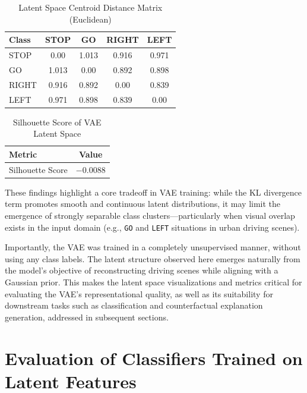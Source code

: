 \begin{table}[h]
\centering
\caption{Latent Space Centroid Distance Matrix (Euclidean)}
\begin{tabular}{lcccc}
\toprule
\textbf{Class} & \textbf{STOP} & \textbf{GO} & \textbf{RIGHT} & \textbf{LEFT} \\
\midrule
STOP   & 0.00 & 1.013 & 0.916 & 0.971 \\
GO     & 1.013 & 0.00 & 0.892 & 0.898 \\
RIGHT  & 0.916 & 0.892 & 0.00 & 0.839 \\
LEFT   & 0.971 & 0.898 & 0.839 & 0.00 \\
\bottomrule
\end{tabular}
\label{tab:centroid_distance_matrix}
\end{table}

\begin{table}[h]
\centering
\caption{Silhouette Score of VAE Latent Space}
\begin{tabular}{lc}
\toprule
\textbf{Metric} & \textbf{Value} \\
\midrule
Silhouette Score & $-0.0088$ \\
\bottomrule
\end{tabular}
\label{tab:silhouette_score}
\end{table}

These findings highlight a core tradeoff in VAE training: while the KL divergence term promotes smooth and continuous latent distributions, it may limit the emergence of strongly separable class clusters—particularly when visual overlap exists in the input domain (e.g., \texttt{GO} and \texttt{LEFT} situations in urban driving scenes).

Importantly, the VAE was trained in a completely unsupervised manner, without using any class labels. The latent structure observed here emerges naturally from the model's objective of reconstructing driving scenes while aligning with a Gaussian prior. This makes the latent space visualizations and metrics critical for evaluating the VAE’s representational quality, as well as its suitability for downstream tasks such as classification and counterfactual explanation generation, addressed in subsequent sections.












\section{Evaluation of Classifiers Trained on Latent Features} \label{sec:classifier_eval}

